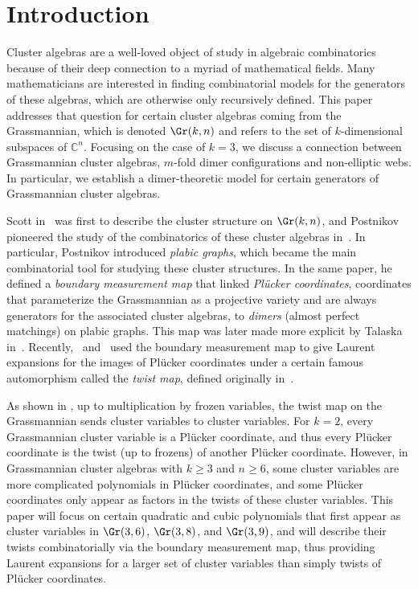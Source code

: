 \section{Introduction}\label{section::intro}
Cluster algebras are a well-loved object of study in algebraic combinatorics because of their deep connection to a myriad of mathematical fields. Many mathematicians are interested in finding combinatorial models for the generators of these algebras, which are otherwise only recursively defined. This paper addresses that question for certain cluster algebras coming from the Grassmannian, which is denoted $\Gr(k,n)$ and refers to the set of $k$-dimensional subspaces of $\mathbb{C}^n$. 
Focusing on the case of $k=3$, we discuss a connection between Grassmannian cluster algebras, $m$-fold dimer configurations and non-elliptic webs. In particular, we establish a dimer-theoretic model for certain generators of Grassmannian cluster algebras.

Scott in~\cite{s06} was first to describe the cluster structure on $\Gr(k,n)$, and Postnikov pioneered the study of the combinatorics of these cluster algebras in~\cite{p06}. In particular, Postnikov introduced \textit{plabic graphs}, which became the main combinatorial tool for studying these cluster structures. In the same paper, he defined a \textit{boundary measurement map} that linked \textit{Pl\"ucker coordinates}, coordinates that parameterize the Grassmannian as a projective variety and are always generators for the associated cluster algebras, to \textit{dimers} (almost perfect matchings) on plabic graphs. This map was later made more explicit by Talaska in~\cite{Tal}. Recently,~\cite{marshscott2016} and~\cite{mullerspeyer}
used the boundary measurement map to give Laurent expansions for the images of Pl\"ucker coordinates under a certain famous automorphism called the \textit{twist map}, defined originally in~\cite{bfz96}.

As shown in \cite[Prop. 8.10]{marshscott2016}, up to multiplication by frozen variables, the twist map on the Grassmannian sends cluster variables to cluster variables.
For $k=2$, every Grassmannian cluster variable is a Pl\"ucker coordinate, and thus every Pl\"ucker coordinate is the twist (up to frozens) of another Pl\"ucker coordinate. However, in Grassmannian cluster algebras with $k \geq 3$ and $n \geq 6$, some cluster variables are more complicated polynomials in Pl\"ucker coordinates, and some Pl\"ucker coordinates only appear as factors in the twists of these cluster variables.
This paper will focus on certain quadratic and cubic polynomials that first appear as cluster variables in $\Gr(3,6)$, $\Gr(3,8)$, and $\Gr(3,9)$, and will describe their twists combinatorially via the boundary measurement map, thus providing Laurent expansions for a larger set of cluster variables than simply twists of Pl\"ucker coordinates.


